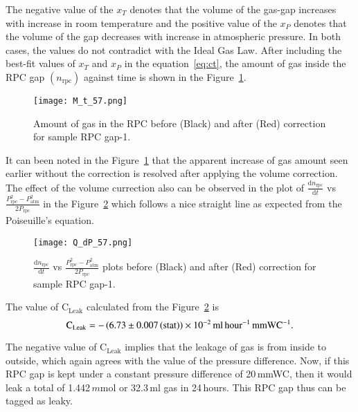 The negative value of the $x_T$ denotes that the volume of the gas-gap increases with increase in room temperature and the positive value of the $x_P$ denotes that the volume of the gap decreases with increase in atmospheric pressure. In both cases, the values do not contradict with the Ideal Gas Law. After including the best-fit values of $x_T$ and $x_P$ in the equation~\ref{eq:ct}, the amount of gas inside the RPC gap $\left(n_{\textrm{rpc}}\right)$ against time is shown in the Figure~\ref{fig:with}.
\begin{figure}[h]
  \centering
  \texttt{[image: M\_t\_57.png]}
  \caption{Amount of gas in the RPC before (Black) and after (Red) correction for sample RPC gap-1.
  }
  \label{fig:with}
\end{figure} 
It can been noted in the Figure~\ref{fig:with} that the apparent increase of gas amount seen earlier without the correction is resolved after applying the volume correction. The effect of the volume currection also can be observed in the plot of $\frac{\mathrm{d}n_{\textrm{rpc}}}{\mathrm{d}t}$ vs $\frac{P_{\textrm{rpc}}^{2}-P_{\textrm{atm}}^{2}}{2P_{\textrm{rpc}}}$ in the Figure~\ref{fig:qt} which follows a nice straight line as expected from the Poiseuille's equation.
\begin{figure}[h]
  \centering
  \texttt{[image: Q\_dP\_57.png]}
  \caption{$\frac{\mathrm{d}n_{\textrm{rpc}}}{\mathrm{d}t}$ vs $\frac{P_{\textrm{rpc}}^{2}-P_{\textrm{atm}}^{2}}{2P_{\textrm{rpc}}}$ plots before (Black) and after (Red) correction for sample RPC gap-1.}
  \label{fig:qt}
\end{figure}

The value of $\textrm{C}_{\textrm{Leak}}$ calculated from the Figure~\ref{fig:qt} is
\[\textrm{C}_{\textrm{Leak}}=-\left(6.73\pm 0.007\left(\textrm{stat}\right)\right)\times 10^{-2}\textrm{\,ml\,hour$^{-1}$\,mmWC$^{-1}$}.\]

The negative value of $\textrm{C}_{\textrm{Leak}}$ implies that the leakage of gas is from inside to outside, which again agrees with the value of the pressure difference. Now, if this RPC gap is kept under a constant pressure difference of 20\,mmWC, then it would leak a total of 1.442\,$m$mol or 32.3\,ml gas in 24\,hours. This RPC gap thus can be tagged as leaky.

